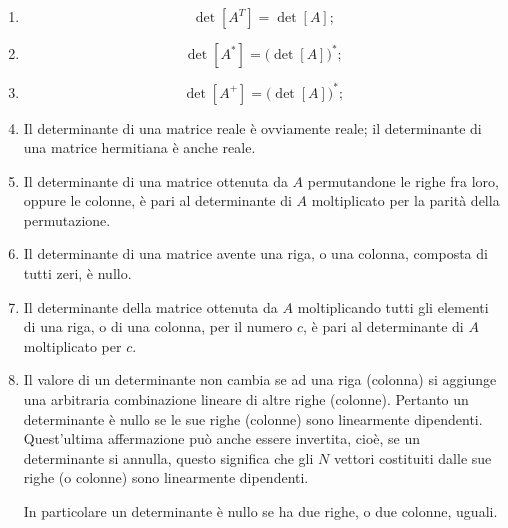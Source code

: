 \documentclass[11pt, a4paper]{book}
\numberwithin{equation}{section}
\begin{document}
\begin{enumerate}
\item
\begin{equation}
    \det[A^T] = \det[A];
    \tag{48}
\end{equation}

\item
\begin{equation}
    \det[A^*] = \bigl(\det[A]\bigr)^*;
    \tag{49}
\end{equation}

\item
\begin{equation}
    \det[A^+] = \bigl(\det[A]\bigr)^*;
    \tag{50}
\end{equation}

\item Il determinante di una matrice reale è ovviamente reale; il determinante di una matrice hermitiana è anche reale.

\item Il determinante di una matrice ottenuta da $A$ permutandone le righe fra loro, oppure le colonne, è pari al determinante di $A$ moltiplicato per la parità della permutazione.

\item Il determinante di una matrice avente una riga, o una colonna, composta di tutti zeri, è nullo.

\item Il determinante della matrice ottenuta da $A$ moltiplicando tutti gli elementi di una riga, o di una colonna, per il numero $c$, è pari al determinante di $A$ moltiplicato per $c$.

\item Il valore di un determinante non cambia se ad una riga (colonna) si aggiunge una arbitraria combinazione lineare di altre righe (colonne). Pertanto un determinante è nullo se le sue righe (colonne) sono linearmente dipendenti. Quest'ultima affermazione può anche essere invertita, cioè, se un determinante si annulla, questo significa che gli $N$ vettori costituiti dalle sue righe (o colonne) sono linearmente dipendenti.

In particolare un determinante è nullo se ha due righe, o due colonne, uguali.


\end{enumerate}
\end{document}
